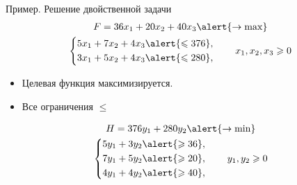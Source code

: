 \documentclass[unicode,11pt,notheorems,xcolor=table]{beamer}
\begin{document}
\begin{frame}{Пример. Решение двойственной задачи}
$$
\begin{gathered}
	F = 36x_1+20x_2+40x_3 \alert{\to \max}\\
	\left\lbrace \begin{aligned}
		5x_1+7x_2+4x_3 &\alert{\leqslant 376},\\
		3x_1+5x_2+4x_3 &\alert{\leqslant 280},\\
	\end{aligned}
	\right.\qquad x_1,x_2,x_3 \geqslant 0 
\end{gathered}
$$

\begin{itemize}
\item 
	Целевая функция максимизируется.
\item 
	Все ограничения  $\leqslant$
\end{itemize}

$$
\begin{gathered}
	H = 376y_1+280y_2 \alert{\to \min}\\
	\left\lbrace \begin{aligned}
		5y_1+3y_2 &\alert{\geqslant 36},\\
		7y_1+5y_2 &\alert{\geqslant 20},\\
		4y_1+4y_2 &\alert{\geqslant 40},\\
	\end{aligned}
	\right.\qquad y_1,y_2 \geqslant 0 
\end{gathered}
$$

\end{frame}
\end{document}
